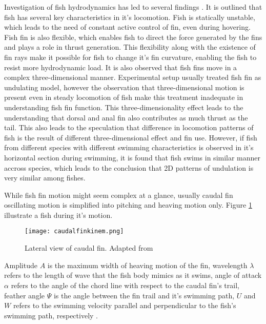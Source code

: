 Investigation of fish hydrodynamics has led to several findings \citet{lauder1}. It is outlined that fish has several key characteristics in it's locomotion. Fish is statically unstable, which leads to the need of constant active control of fin, even during hovering. Fish fin is also flexible, which enables fish to direct the force generated by the fins and plays a role in thrust generation. This flexibility along with the existence of fin rays make it possible for fish to change it's fin curvature, enabling the fish to resist more hydrodynamic load. It is also observed that fish fins move in a complex three-dimensional manner. Experimental setup usually treated fish fin as undulating model, however the observation that three-dimensional motion is present even in steady locomotion of fish make this treatment inadequate in understanding fish fin function. This three-dimensionality effect leads to the understanding that dorsal and anal fin also contributes as much thrust as the tail. This also leads to the speculation that difference in locomotion patterns of fish is the result of different three-dimensional effect and fin use. However, if fish from different species with different swimming characteristics is observed in it's horizontal section during swimming, it is found that fish swims in similar manner accross species, which leads to the conclusion that 2D patterns of undulation is very similar among fishes.\par
While fish fin motion might seem complex at a glance, usually caudal fin oscillating motion is simplified into pitching and heaving motion only. Figure \ref{fig:caudalfinkinem} illustrate a fish during it's motion.
\begin{figure}[H]
    \centering
    \texttt{[image: caudalfinkinem.png]}
    \caption{Lateral view of caudal fin. Adapted from \citet{magnuson}}
    \label{fig:caudalfinkinem}
\end{figure}
Amplitude $A$ is the maximum width of heaving motion of the fin, wavelength $\lambda$ refers to the length of wave that the fish body mimics as it swims, angle of attack $\alpha$ refers to the angle of the chord line with respect to the caudal fin's trail, feather angle $\Psi$ is the angle between the fin trail and it's swimming path, $U$ and $W$ refers to the swimming velocity parallel and perpendicular to the fish's swimming path, respectively \citep{sfakiotakis}.
